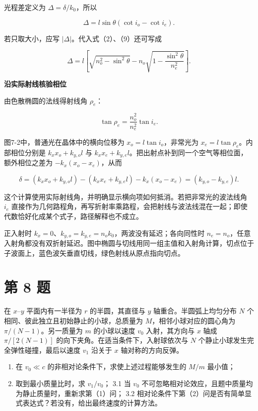 \documentclass[12pt,a4paper,UTF8]{ctexart}
\newcommand{\tightlist}{\setlength{\itemsep}{0pt}\setlength{\parskip}{0pt}}
\begin{document}
光程差定义为 \(\Delta=\delta/k_0\)，所以

\[\boxed{
\Delta=l\sin\theta(\cot i_o-\cot i_e)}.\]

若只取大小，应写 \(|\Delta|\)。代入式（2）、（9）还可写成

\[\boxed{
\Delta=l\left[
\sqrt{n_o^2-\sin^2\theta}
-n_o\sqrt{1-\frac{\sin^2\theta}{n_e^2}}
\right]}.\]

\textbf{沿实际射线核验相位}

由色散椭圆的法线得射线角 \(\rho_e\)：

\[\tan\rho_e=\frac{n_o^2}{n_e^2}\tan i_e.\]

图7-2中，普通光在晶体中的横向位移为 \(x_o=l\tan i_o\)，非常光为
\(x_e=l\tan\rho_e\)。内部相位分别是 \(k_xx_o+k_{y,o}l\) 与
\(k_xx_e+k_{y,e}l\)。把出射点补到同一个空气等相位面，额外相位之差为
\(-k_x(x_o-x_e)\)，从而

\[\delta=(k_xx_o+k_{y,o}l)-(k_xx_e+k_{y,e}l)
-k_x(x_o-x_e)
=(k_{y,o}-k_{y,e})l.\]

这个计算使用实际射线角，并明确显示横向项如何抵消。若把非常光的波法线角
\(i_e\)
直接作为几何路程角，再写折射率乘路程，会把射线与波法线混在一起；即使代数恰好化成某个式子，路径解释也不成立。

正入射时 \(k_x=0\)、\(k_{y,o}=k_{y,e}=n_ok_0\)，两波没有延迟；各向同性时
\(n_e=n_o\)，任意入射角都没有双折射延迟。图中椭圆与切线用同一组主值和入射角计算，切点位于子波面上，蓝色波矢垂直切线，绿色射线从原点指向切点。

\newpage

\section{第 8 题}\label{ux7b2c-8-ux9898}

在 \(x\)--\(y\) 平面内有一半径为 \(r\) 的半圆，其直径与 \(y\)
轴重合。半圆弧上均匀分布 \(N\)
个相同、彼此独立且初始静止的小球，总质量为 \(M\)，相邻小球对应的圆心角为
\(\pi/(N-1)\)。另一质量为 \(m\) 的小球以速度 \(v_0\) 入射，其方向与
\(x\) 轴成 \(\pi/[2(N-1)]\) 的向下夹角。在适当条件下，入射球依次与 \(N\)
个静止小球发生完全弹性碰撞，最后以速度 \(v_1\) 沿关于 \(x\)
轴对称的方向反弹。

\begin{enumerate}
\def\labelenumi{\arabic{enumi}.}
\tightlist
\item
  在 \(v_0\ll c\) 的非相对论条件下，求使上述过程能够发生的 \(M/m\)
  最小值；
\item
  取到最小质量比时，求 \(v_1/v_0\)； 3.1 当 \(v_0\)
  不可忽略相对论效应，且题中质量均为静止质量时，重新求第（1）问； 3.2
  相对论条件下第（2）问是否有简单显式表达式？若没有，给出最终速度的计算方法。
\end{enumerate}
\end{document}
